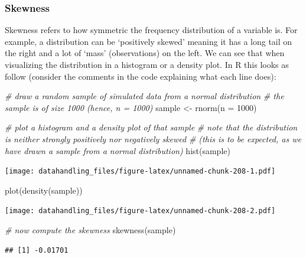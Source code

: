 \documentclass[
  12pt,
]{style/krantz}
\newenvironment{Shaded}{\begin{snugshade}}{\end{snugshade}}
\newcommand{\AttributeTok}[1]{\textcolor[rgb]{0.77,0.63,0.00}{#1}}
\newcommand{\CommentTok}[1]{\textcolor[rgb]{0.56,0.35,0.01}{\textit{#1}}}
\newcommand{\DecValTok}[1]{\textcolor[rgb]{0.00,0.00,0.81}{#1}}
\newcommand{\FunctionTok}[1]{\textcolor[rgb]{0.00,0.00,0.00}{#1}}
\newcommand{\NormalTok}[1]{#1}
\newcommand{\OtherTok}[1]{\textcolor[rgb]{0.56,0.35,0.01}{#1}}
\begin{document}
\hypertarget{skewness}{%
\subsubsection{Skewness}\label{skewness}}

Skewness refers to how symmetric the frequency distribution of a variable is. For example, a distribution can be `positively skewed' meaning it has a long tail on the right and a lot of `mass' (observations) on the left. We can see that when visualizing the distribution in a histogram or a density plot. In R this looks as follow (consider the comments in the code explaining what each line does):

\begin{Shaded}
\begin{Highlighting}[]
\CommentTok{\# draw a random sample of simulated data from a normal distribution}
\CommentTok{\# the sample is of size 1000 (hence, n = 1000)}
\NormalTok{sample }\OtherTok{\textless{}{-}} \FunctionTok{rnorm}\NormalTok{(}\AttributeTok{n =} \DecValTok{1000}\NormalTok{)}

\CommentTok{\# plot a histogram and a density plot of that sample}
\CommentTok{\# note that the distribution is neither strongly positively nor negatively skewed}
\CommentTok{\# (this is to be expected, as we have drawn a sample from a normal distribution)}
\FunctionTok{hist}\NormalTok{(sample)}
\end{Highlighting}
\end{Shaded}

\texttt{[image: datahandling\_files/figure-latex/unnamed-chunk-208-1.pdf]}

\begin{Shaded}
\begin{Highlighting}[]
\FunctionTok{plot}\NormalTok{(}\FunctionTok{density}\NormalTok{(sample))}
\end{Highlighting}
\end{Shaded}

\texttt{[image: datahandling\_files/figure-latex/unnamed-chunk-208-2.pdf]}

\begin{Shaded}
\begin{Highlighting}[]
\CommentTok{\# now compute the skewness}
\FunctionTok{skewness}\NormalTok{(sample)}
\end{Highlighting}
\end{Shaded}

\begin{verbatim}
## [1] -0.01701
\end{verbatim}
\end{document}
